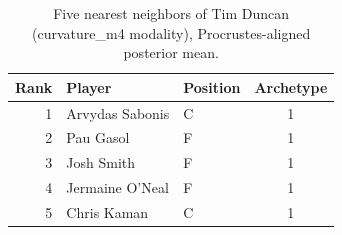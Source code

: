 \begin{table}[htbp]
  \centering\small
  \begin{tabular}{rllc}
    \toprule
    Rank & Player & Position & Archetype \\
    \midrule
    1 & Arvydas Sabonis & C & 1 \\
    2 & Pau Gasol & F & 1 \\
    3 & Josh Smith & F & 1 \\
    4 & Jermaine O'Neal & F & 1 \\
    5 & Chris Kaman & C & 1 \\
    \bottomrule
  \end{tabular}
  \caption{Five nearest neighbors of Tim Duncan (curvature_m4 modality), Procrustes-aligned posterior mean.}
  \label{tab:Tim_Duncan_neighbors_curvature_m4}
\end{table}


